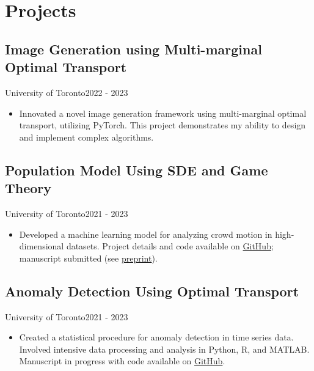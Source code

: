 \section{Projects}
\subsection{Image Generation using Multi-marginal Optimal Transport}{University of Toronto}{2022 - 2023}
\begin{itemize}[leftmargin=*]
    \item Innovated a novel image generation framework using multi-marginal optimal transport, utilizing PyTorch. This project demonstrates my ability to design and implement complex algorithms.
\end{itemize}

\subsection{Population Model Using SDE and Game Theory}{University of Toronto}{2021 - 2023}
\begin{itemize}[leftmargin=*]
    \item Developed a machine learning model for analyzing crowd motion in high-dimensional datasets. Project details and code available on \href{https://github.com/Diebrate/population_model}{GitHub}; manuscript submitted (see \href{https://www.biorxiv.org/content/10.1101/2023.08.10.552373v1}{preprint}).
\end{itemize}

\subsection{Anomaly Detection Using Optimal Transport}{University of Toronto}{2021 - 2023}
\begin{itemize}[leftmargin=*]
    \item Created a statistical procedure for anomaly detection in time series data. Involved intensive data processing and analysis in Python, R, and MATLAB. Manuscript in progress with code available on \href{https://github.com/Diebrate/scRNA_study}{GitHub}.
\end{itemize}
